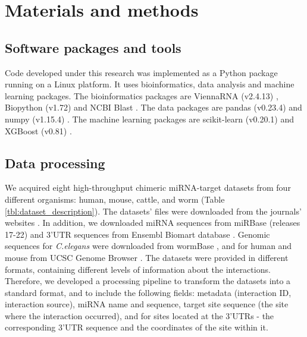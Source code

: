 \chapter{Materials and methods}
\label{chap:methods}
\section{Software packages and tools}
Code developed under this research was implemented as a Python package running on a Linux platform. It uses bioinformatics, data analysis and machine learning packages. The bioinformatics packages are ViennaRNA (v2.4.13) \cite{lorenz2011viennarna}, Biopython (v1.72) \cite{cock2009biopython} and NCBI Blast \cite{altschul1990basic_blast}. The data packages are pandas (v0.23.4) \cite{mckinney2010data_pandas} and numpy (v1.15.4) \cite{oliphant2006guide_numpy}. The machine learning packages are scikit-learn (v0.20.1) \cite{pedregosa2011scikit} and XGBoost (v0.81) \cite{xgboost}.

\section{Data processing}
We acquired eight high-throughput chimeric miRNA-target datasets from four different organisms: human, mouse, cattle, and worm (Table \ref{tbl:dataset_description}). The datasets' files were downloaded from the journals' websites \cite{scheel2017global, grosswendt2014unambiguous, broughton2016pairing, helwak2013mapping, darnell_moore2015mirna}. In addition, we downloaded miRNA sequences from miRBase (releases 17-22) \cite{kozomara2013mirbase} and 3'UTR sequences from Ensembl Biomart database \cite{smedley2015biomart}. Genomic sequences for \textit{C.elegans} were downloaded from wormBase \cite{lee2017wormbase}, and for human and mouse from UCSC Genome Browser \cite{karolchik2004ucsc}.
The datasets were provided in different formats, containing different levels of information about the interactions. Therefore, we developed a processing pipeline to transform the datasets into a standard format, and to include the following fields: metadata (interaction ID, interaction source), miRNA name and sequence, target site sequence (the site where the interaction occurred), and for sites located at the 3'UTRs - the corresponding 3'UTR sequence and the coordinates of the site within it.

